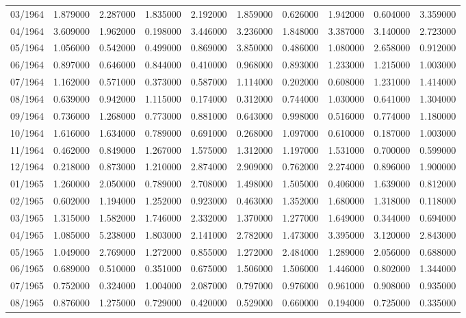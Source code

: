 \begin{tabular}{lrrrrrrrrr}
03/1964 & 1.879000 & 2.287000 & 1.835000 & 2.192000 & 1.859000 & 0.626000 & 1.942000 & 0.604000 & 3.359000 \\
04/1964 & 3.609000 & 1.962000 & 0.198000 & 3.446000 & 3.236000 & 1.848000 & 3.387000 & 3.140000 & 2.723000 \\
05/1964 & 1.056000 & 0.542000 & 0.499000 & 0.869000 & 3.850000 & 0.486000 & 1.080000 & 2.658000 & 0.912000 \\
06/1964 & 0.897000 & 0.646000 & 0.844000 & 0.410000 & 0.968000 & 0.893000 & 1.233000 & 1.215000 & 1.003000 \\
07/1964 & 1.162000 & 0.571000 & 0.373000 & 0.587000 & 1.114000 & 0.202000 & 0.608000 & 1.231000 & 1.414000 \\
08/1964 & 0.639000 & 0.942000 & 1.115000 & 0.174000 & 0.312000 & 0.744000 & 1.030000 & 0.641000 & 1.304000 \\
09/1964 & 0.736000 & 1.268000 & 0.773000 & 0.881000 & 0.643000 & 0.998000 & 0.516000 & 0.774000 & 1.180000 \\
10/1964 & 1.616000 & 1.634000 & 0.789000 & 0.691000 & 0.268000 & 1.097000 & 0.610000 & 0.187000 & 1.003000 \\
11/1964 & 0.462000 & 0.849000 & 1.267000 & 1.575000 & 1.312000 & 1.197000 & 1.531000 & 0.700000 & 0.599000 \\
12/1964 & 0.218000 & 0.873000 & 1.210000 & 2.874000 & 2.909000 & 0.762000 & 2.274000 & 0.896000 & 1.900000 \\
01/1965 & 1.260000 & 2.050000 & 0.789000 & 2.708000 & 1.498000 & 1.505000 & 0.406000 & 1.639000 & 0.812000 \\
02/1965 & 0.602000 & 1.194000 & 1.252000 & 0.923000 & 0.463000 & 1.352000 & 1.680000 & 1.318000 & 0.118000 \\
03/1965 & 1.315000 & 1.582000 & 1.746000 & 2.332000 & 1.370000 & 1.277000 & 1.649000 & 0.344000 & 0.694000 \\
04/1965 & 1.085000 & 5.238000 & 1.803000 & 2.141000 & 2.782000 & 1.473000 & 3.395000 & 3.120000 & 2.843000 \\
05/1965 & 1.049000 & 2.769000 & 1.272000 & 0.855000 & 1.272000 & 2.484000 & 1.289000 & 2.056000 & 0.688000 \\
06/1965 & 0.689000 & 0.510000 & 0.351000 & 0.675000 & 1.506000 & 1.506000 & 1.446000 & 0.802000 & 1.344000 \\
07/1965 & 0.752000 & 0.324000 & 1.004000 & 2.087000 & 0.797000 & 0.976000 & 0.961000 & 0.908000 & 0.935000 \\
08/1965 & 0.876000 & 1.275000 & 0.729000 & 0.420000 & 0.529000 & 0.660000 & 0.194000 & 0.725000 & 0.335000 \\

\end{tabular}
